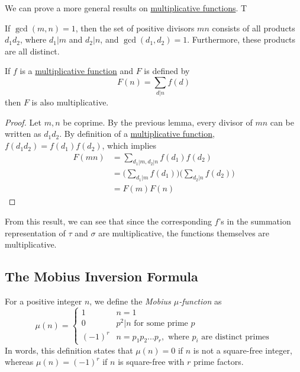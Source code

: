 \documentclass{article}
\newcounter{theorem}[section]
\newcounter{definition}[section]
\begin{document}
We can prove a more general results on \hyperref[def:multiplicative-function]{multiplicative functions}. T

\begin{lemma}
  \label{thm:divisors-of-a-coprime-product}
If $\gcd(m, n) = 1$, then the set of positive divisors $mn$ consists of all products $d_1 d_2$, where $d_1 | m$ and $d_2 | n$, and $\gcd(d_1, d_2) = 1$. Furthermore, these products are all distinct. 
\end{lemma}

\begin{theorem}
  \label{thm:divisor-sums-preserve-multiplicativity}
If $f$ is a \hyperref[def:multiplicative-function]{multiplicative function} and $F$ is defined by 
\begin{equation}
  F(n) = \sum_{d|n} f(d)
\end{equation}
then $F$ is also multiplicative. 
\end{theorem}
\begin{proof}
Let $m, n$ be coprime. By the previous lemma, every divisor of $mn$ can be written as $d_1 d_2$. By definition of a \hyperref[def:multiplicative-function]{multiplicative function}, $f(d_1d_2) = f(d_1) f(d_2)$, which implies
\begin{align*}
    F(mn) & = \sum_{d_1|m, d_2|n} f(d_1) f(d_2) \\
    & = \bigg( \sum_{d_1|m} f(d_1) \bigg) \bigg( \sum_{d_2|n} f(d_2) \bigg) \\
    & = F(m) F(n)
\end{align*}
\end{proof}

From this result, we can see that since the corresponding $f$'s in the summation representation of $\tau$ and $\sigma$ are multiplicative, the functions themselves are multiplicative. 

\subsection{The Mobius Inversion Formula}

\begin{definition}
  \label{def:mobius-mu-function}
For a positive integer $n$, we define the \textit{Mobius $\mu$-function} as 
\begin{equation}
  \mu(n) = \begin{cases}
  1 & n = 1 \\
  0 & p^2 | n \text{ for some prime } p \\
  (-1)^r & n = p_1 p_2 ... p_r, \text{ where } p_i \text{ are distinct primes}
  \end{cases}
\end{equation}
In words, this definition states that $\mu(n) = 0$ if $n$ is not a square-free integer, whereas $\mu(n) = (-1)^r$ if $n$ is square-free with $r$ prime factors. 
\end{definition}
\end{document}
